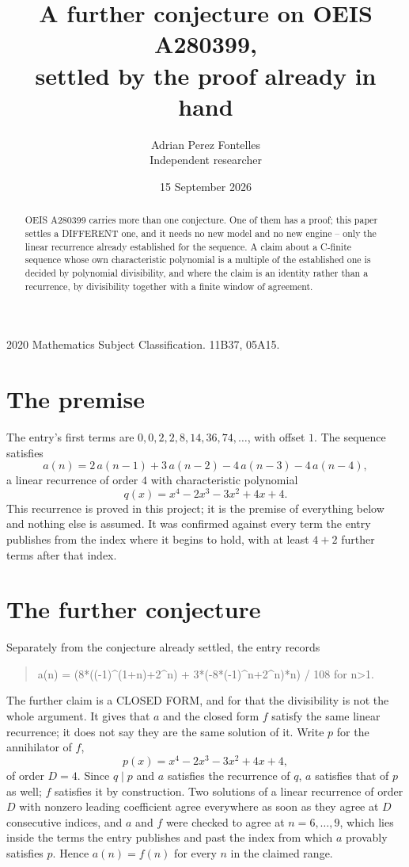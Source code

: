 \documentclass[11pt,a4paper]{article}
\title{A further conjecture on OEIS A280399,\\ \large settled by the proof already in hand}
\author{Adrian Perez Fontelles\\ \small Independent researcher}
\date{15 September 2026}
\theoremstyle{plain}
\theoremstyle{definition}
\begin{document}
\maketitle

\begin{abstract}
OEIS A280399 carries more than one conjecture. One of them has a proof; this paper settles a
DIFFERENT one, and it needs no new model and no new engine -- only the linear recurrence already
established for the sequence. A claim about a C-finite sequence whose own characteristic
polynomial is a multiple of the established one is decided by polynomial divisibility, and where
the claim is an identity rather than a recurrence, by divisibility together with a finite window
of agreement.
\end{abstract}

\noindent\small 2020 Mathematics Subject Classification. 11B37, 05A15.\normalsize

\section{The premise}

The entry's first terms are $0, 0, 2, 2, 8, 14, 36, 74,\dots$, with offset $1$. The sequence satisfies
\[
  a(n)=2\,a(n-1) + 3\,a(n-2) - 4\,a(n-3) - 4\,a(n-4) ,
\]
a linear recurrence of order $4$ with characteristic polynomial
\[
  q(x)=x^{4} - 2 x^{3} - 3 x^{2} + 4 x + 4 .
\]
This recurrence is proved in this project; it is the premise of everything below and nothing else is assumed.
It was confirmed against every term the entry publishes from the index where it begins to hold,
with at least $4+2$ further terms after that index.

\section{The further conjecture}

Separately from the conjecture already settled, the entry records

\begin{quote}\raggedright a(n) = (8*((-1)\^{}(1+n)+2\^{}n) + 3*(-8*(-1)\^{}n+2\^{}n)*n) / 108 for n>1.\end{quote}

The further claim is a CLOSED FORM, and for that the divisibility is not the whole argument. It
gives that $a$ and the closed form $f$ satisfy the same linear recurrence; it does not say they
are the same solution of it. Write $p$ for the annihilator of $f$,
\[
  p(x)=x^{4} - 2 x^{3} - 3 x^{2} + 4 x + 4 ,
\]
of order $D=4$. Since $q\mid p$ and $a$ satisfies the recurrence of $q$, $a$ satisfies that of
$p$ as well; $f$ satisfies it by construction. Two solutions of a linear recurrence of order $D$
with nonzero leading coefficient agree everywhere as soon as they agree at $D$ consecutive
indices, and $a$ and $f$ were checked to agree at $n=6,\dots,9$,
which lies inside the terms the entry publishes and past the index from which $a$ provably
satisfies $p$. Hence $a(n)=f(n)$ for every $n$ in the claimed range.
\end{document}
